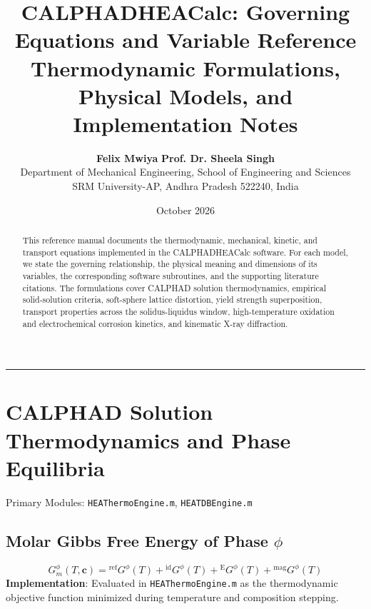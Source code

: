 \documentclass[11pt,a4paper]{article}
\title{\textbf{CALPHADHEACalc: Governing Equations and Variable Reference}\\[0.3em]
\large Thermodynamic Formulations, Physical Models, and Implementation Notes}
\author{
  \textbf{Felix Mwiya} \quad \textbf{Prof. Dr. Sheela Singh}\\[0.4em]
  \small Department of Mechanical Engineering, School of Engineering and Sciences\\
  \small SRM University-AP, Andhra Pradesh 522240, India
}
\date{October 2026}
\begin{document}
\maketitle

\begin{abstract}
This reference manual documents the thermodynamic, mechanical, kinetic, and transport equations implemented in the CALPHADHEACalc software. For each model, we state the governing relationship, the physical meaning and dimensions of its variables, the corresponding software subroutines, and the supporting literature citations. The formulations cover CALPHAD solution thermodynamics, empirical solid-solution criteria, soft-sphere lattice distortion, yield strength superposition, transport properties across the solidus-liquidus window, high-temperature oxidation and electrochemical corrosion kinetics, and kinematic X-ray diffraction.
\end{abstract}

\tableofcontents
\vspace{1em}
\hrule
\vspace{1.5em}

\section{CALPHAD Solution Thermodynamics and Phase Equilibria}
Primary Modules: \texttt{HEAThermoEngine.m}, \texttt{HEATDBEngine.m}

\subsection{Molar Gibbs Free Energy of Phase $\phi$}
\begin{equation}
G_m^\phi(T, \mathbf{c}) = {^{\text{ref}}}G^\phi(T) + {^{\text{id}}}G^\phi(T) + {^{\text{E}}}G^\phi(T) + {^{\text{mag}}}G^\phi(T)
\end{equation}
\textbf{Implementation}: Evaluated in \texttt{HEAThermoEngine.m} as the thermodynamic objective function minimized during temperature and composition stepping.
\end{document}
